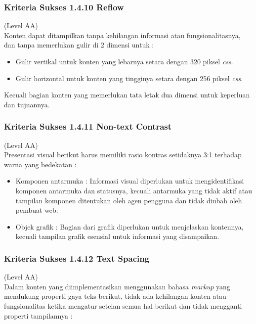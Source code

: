 \documentclass[a4paper,twoside]{article}
\begin{document}
\begin{enumerate}
		\subsubsection*{Kriteria Sukses 1.4.10 Reflow}
		\label{subsubsec:kriteria_1.4.10}
		(Level AA) \\
		
		Konten dapat ditampilkan tanpa kehilangan informasi atau fungsionalitasnya, dan tanpa memerlukan gulir di 2 dimensi untuk :
		
		\begin{itemize}
			\item Gulir vertikal untuk konten yang lebarnya setara dengan 320 piksel \textit{css}.
			\item Gulir horizontal untuk konten yang tingginya setara dengan 256 piksel \textit{css}.
		\end{itemize}
		
		Kecuali bagian konten yang memerlukan tata letak dua dimensi untuk keperluan dan tujuannya.
		
		\subsubsection*{Kriteria Sukses 1.4.11 Non-text Contrast}
		\label{subsubsec:kriteria_1.4.11}
		(Level AA) \\
		
		Presentasi visual berikut harus memiliki rasio kontras setidaknya 3:1 terhadap warna yang bedekatan :
		
		\begin{itemize}
			\item Komponen antarmuka : Informasi visual diperlukan untuk mengidentifikasi komponen antarmuka dan statusnya, kecuali antarmuka yang tidak aktif atau tampilan komponen ditentukan oleh agen pengguna dan tidak diubah oleh pembuat web.
			\item Objek grafik : Bagian dari grafik diperlukan untuk menjelaskan kontennya, kecuali tampilan grafik esensial untuk informasi yang disampaikan.
		\end{itemize}
		
		\subsubsection*{Kriteria Sukses 1.4.12 Text Spacing}
		\label{subsubsec:kriteria_1.4.12}
		(Level AA) \\
		
		Dalam konten yang diimplementasikan menggunakan bahasa \textit{markup} yang mendukung properti gaya teks berikut, tidak ada kehilangan konten atau fungsionalitas ketika mengatur setelan semua hal berikut dan tidak mengganti properti tampilannya : 
		

\end{enumerate}
\end{document}
